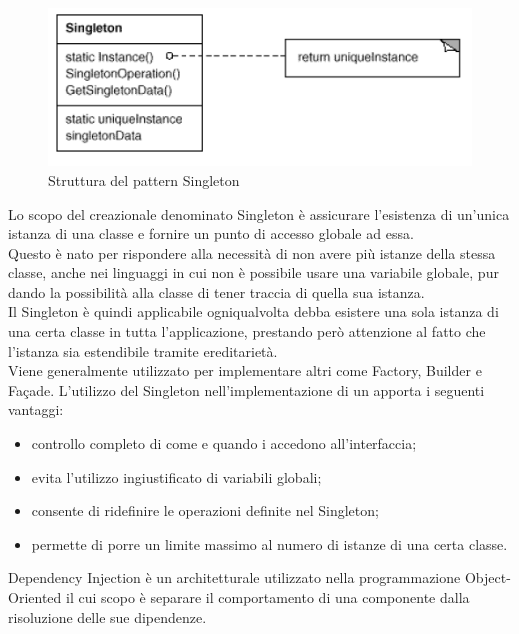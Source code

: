 	 \label{app:singleton}
		\begin{figure}[H]\centering
        \includegraphics[scale=0.7]{SpecificaTecnica/Pics/Singleton}
        \caption{Struttura del pattern Singleton}
		\end{figure}
		Lo scopo del  creazionale denominato Singleton è 
		assicurare l'esistenza di un'unica istanza di una classe e fornire
		un punto di accesso globale ad essa.\\
		Questo  è nato per rispondere alla necessità di non avere più
		istanze della stessa classe, anche nei linguaggi in cui non è possibile 
		usare una variabile globale, pur dando la possibilità alla classe di
		tener traccia di quella sua istanza.\\
		Il  Singleton è quindi applicabile ogniqualvolta debba esistere una 
		sola istanza di una certa classe in tutta l'applicazione, prestando però attenzione 
		al fatto che l'istanza sia estendibile tramite ereditarietà.\\
		Viene generalmente utilizzato per implementare altri  come Factory, 
		Builder e Façade.
		L'utilizzo del Singleton nell'implementazione di un  apporta i seguenti 
		vantaggi:
		\begin{itemize}
		\item controllo completo di come e quando i  accedono all'interfaccia;
		\item evita l'utilizzo ingiustificato di variabili globali;
		\item consente di ridefinire le operazioni definite nel Singleton;
		\item permette di porre un limite massimo al numero di istanze di una certa classe.
		\end{itemize}
	 \label{app:dependencyinjection}
Dependency Injection è un  architetturale utilizzato nella programmazione Object-Oriented il cui scopo è separare il comportamento di una componente dalla risoluzione delle sue dipendenze. \\
